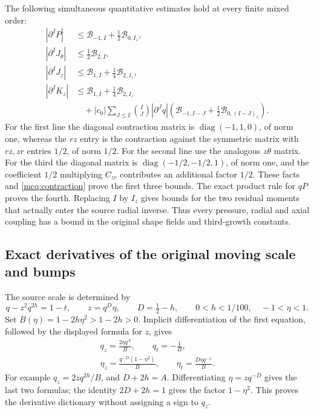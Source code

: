 \documentclass[11pt]{article}
\begin{document}
The following simultaneous quantitative estimates hold at every finite
mixed order:
\begin{equation}\label{mcq:defect_bounds}
\begin{split}
 |\partial^IP|&\le
       \mathcal B_{-1,I}+\tfrac12\mathcal B_{0,I_z},\\
 |\partial^IJ_\theta|&\le\tfrac12\mathcal B_{2,I},\\
 |\partial^IJ_z|&\le
       \mathcal B_{1,I}+\tfrac14\mathcal B_{2,I_z},\\
 |\partial^IK_z|&\le
       \mathcal B_{1,I}+\tfrac14\mathcal B_{2,I_z}\\
 &\quad+|c_0|\sum_{J\le I}\binom IJ
       |\partial^Jq|\left(
       \mathcal B_{-1,I-J}+\tfrac12\mathcal B_{0,(I-J)_z}\right).
\end{split}
\end{equation}
For the first line the diagonal contraction matrix is
\(\operatorname{diag}(-1,1,0)\), of norm one, whereas the \(rz\)
entry is the contraction against the symmetric matrix with \(rz,zr\)
entries \(1/2\), of norm \(1/2\). For the second line use the
analogous \(z\theta\) matrix. For the third the diagonal matrix is
\(\operatorname{diag}(-1/2,-1/2,1)\), of norm one, and the
coefficient \(1/2\) multiplying \(C_{zr}\) contributes an additional
factor \(1/2\). These facts and \eqref{mcq:contraction} prove the first
three bounds. The exact product rule for \(qP\) proves the fourth.
Replacing \(I\) by \(I_z\) gives bounds for the two residual moments
that actually enter the source radial inverse. Thus every pressure,
radial and axial coupling has a bound in the original shape fields
and third-growth constants.

\subsection{Exact derivatives of the original moving scale and bumps}

The source scale is determined by
\[
 q-z^2q^{2h}=1-t,\qquad z=q^D\eta,\qquad
 D=\tfrac12-h,\qquad 0<h<1/100,\quad -1<\eta<1 .
\]
Set \(B(\eta)=1-2h\eta^2>1-2h>0\). Implicit differentiation of the
first equation, followed by the displayed formula for \(z\), gives
\begin{equation}\label{mcq:q_derivatives}
\begin{gathered}
 q_z=\frac{2\eta q^A}{B},\qquad q_t=-\frac1B,\\
 \eta_z=\frac{q^{-D}(1-\eta^2)}B,\qquad
 \eta_t=\frac{D\eta q^{-1}}B .
\end{gathered}
\end{equation}
For example \(q_z=2zq^{2h}/B\), and \(D+2h=A\).
Differentiating \(\eta=zq^{-D}\) gives the last two formulas;
the identity \(2D+2h=1\) gives the factor \(1-\eta^2\).
This proves the derivative dictionary without assigning a sign to \(q_z\).
\end{document}
